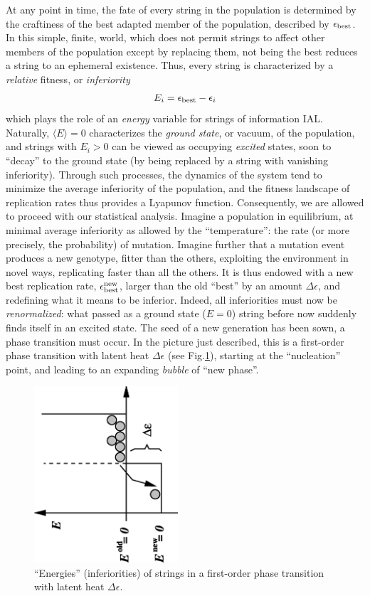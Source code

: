 \documentclass[letterpaper]{article}
\begin{document}
At any point in time, the fate of every string in the population is
determined by the craftiness of the best adapted member of the
population, described by $\epsilon_{\rm best}$. In this simple,
finite, world, which does not permit strings to affect other members
of the population except by replacing them, not being the best reduces
a string to an ephemeral existence. Thus, every string is
characterized by a {\em relative} fitness, or {\em inferiority}
\begin{eqnarray}
E_i=\epsilon_{\rm best}-\epsilon_i
\end{eqnarray}
which plays the role of an {\em energy} variable for strings of
information {IAL}. Naturally, $\langle E\rangle=0$ characterizes the
{\em ground state}, or vacuum, of the population, and strings with
$E_i>0$ can be viewed as occupying {\em excited} states, soon to
``decay'' to the ground state (by being replaced by a string with
vanishing inferiority). Through such processes, the dynamics of the
system tend to minimize the average inferiority of the population, and
the fitness landscape of replication rates thus provides a Lyapunov
function. Consequently, we are allowed to proceed with our statistical
analysis. Imagine a population in equilibrium, at minimal average
inferiority as allowed by the ``temperature'': the rate (or more
precisely, the probability) of mutation. Imagine further that a
mutation event produces a new genotype, fitter than the others,
exploiting the environment in novel ways, replicating faster than all
the others. It is thus endowed with a new best replication rate,
$\epsilon_{\rm best}^{\rm new}$, larger than the old ``best'' by an
amount $\Delta \epsilon$, and redefining what it means to be
inferior. Indeed, all inferiorities must now be {\em renormalized}:
what passed as a ground state ($E=0$) string before now suddenly finds
itself in an excited state. The seed of a new generation has been
sown, a phase transition must occur. In the picture just described,
this is a first-order phase transition with latent heat
$\Delta\epsilon$ (see Fig.\ref{fig1}), starting at the ``nucleation''
point, and leading to an expanding {\em bubble} of ``new phase''.


\begin{figure}[t]
\begin{center}
\includegraphics[width=2.1in,angle=-90]{fig1.eps}
\caption{``Energies'' (inferiorities) of strings in a first-order
  phase transition with latent heat $\Delta\epsilon$.}
\label{fig1}
\end{center}
\end{figure}
\end{document}
